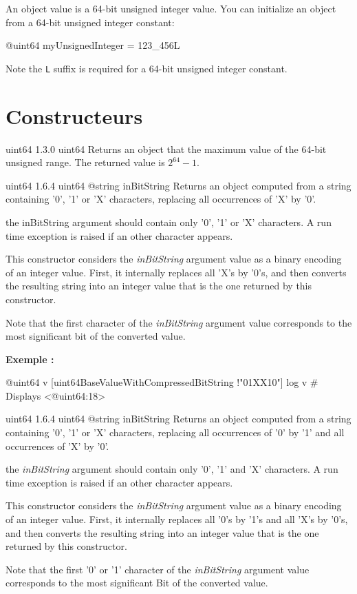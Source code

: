 

An  object value is a 64-bit unsigned integer value. You can initialize an  object from a 64-bit unsigned integer constant:

\begin{galgascode}
@uint64 myUnsignedInteger = 123_456L
\end{galgascode}

Note the \texttt{L} suffix is required for a 64-bit unsigned integer constant.

\section{Constructeurs}

{uint64}
{1.3.0}
{uint64}
{Returns an  object that the maximum value of the 64-bit unsigned range.}
{The returned value is $2^{64}-1$.}


{uint64}
{1.6.4}
{uint64}
{@string inBitString}
{Returns an  object computed from a string containing '0', '1' or 'X' characters, replacing all occurrences of 'X' by '0'.}
{the inBitString argument should contain only '0', '1' or 'X' characters. A run time exception is raised if an other character appears.

This constructor considers the \emph{inBitString} argument value as a binary encoding of an integer value. First, it internally replaces all 'X's by '0's, and then converts the resulting string into an integer value that is the one returned by this constructor.

Note that the first character of the \emph{inBitString} argument value corresponds to the most significant bit of the converted value.}


\textbf{Exemple :}
\begin{galgascode}
@uint64 v [uint64BaseValueWithCompressedBitString !"01XX10"]
log v # Displays <@uint64:18>
\end{galgascode}





{uint64}
{1.6.4}
{uint64}
{@string inBitString}
{Returns an  object computed from a string containing '0', '1' or 'X' characters, replacing all occurrences of '0' by '1' and all occurrences of 'X' by '0'.}
{the \emph{inBitString} argument should contain only '0', '1' and 'X' characters. A run time exception is raised if an other character appears.

This constructor considers the \emph{inBitString} argument value as a binary encoding of an integer value. First, it internally replaces all '0's by '1's and all 'X's by '0's, and then converts the resulting string into an integer value that is the one returned by this constructor.

Note that the first '0' or '1' character of the \emph{inBitString} argument value corresponds to the most significant Bit of the converted value.}

